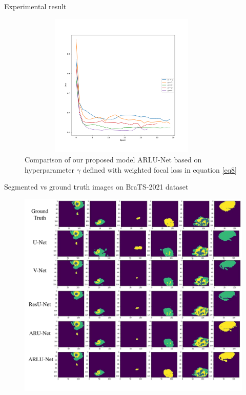 \documentclass [xcolor=svgnames, t] {beamer}
\begin{document}
\begin{frame}{Experimental result}
\vspace{-5mm}
    \begin{figure}[H]
        \centering
        \includegraphics[width=10cm,height=6.9cm]{result.pdf}
        \centering
        \caption{Comparison of our proposed model ARLU-Net based on hyperparameter $\gamma$ defined with weighted focal loss in equation \eqref{eq8}}
    \end{figure}
\end{frame}

\begin{frame}{Segmented vs ground truth images on BraTS-2021 dataset}
\vspace{-1em}
\begin{figure}[H]
\includegraphics[width=0.8\linewidth,page=1]{segmentation.pdf}
\centering
\end{figure}
\end{frame}
\end{document}

